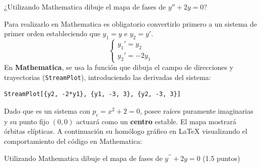 \begin{ejer}[6]
¿Utilizando Mathematica dibuje el mapa de fases de $y''+2y=0$?
\end{ejer}
\begin{sol}
Para realizarlo en Mathematica es obligatorio convertirlo primero a un sistema de primer orden estableciendo que $y_1 = y$ e $y_2 = y'$.
$$\begin{cases} y_1' = y_2 \\ y_2' = -2y_1 \end{cases}$$
En \textbf{Mathematica}, se usa la función que dibuja el campo de direcciones y trayectorias (\texttt{StreamPlot}), introduciendo las derivadas del sistema:

\begin{verbatim}
StreamPlot[{y2, -2*y1}, {y1, -3, 3}, {y2, -3, 3}]
\end{verbatim}

Dado que es un sistema con $p_c = x^2+2 = 0$, posee raíces puramente imaginarias y su punto fijo $(0,0)$ actuará como un \textbf{centro} estable. El mapa mostrará órbitas elípticas. A continuación su homólogo gráfico en \LaTeX{} visualizando el comportamiento del código en Mathematica:

\begin{center}
\end{center}
\end{sol}
\begin{ejer}[6]
Utilizando Mathematica dibuje el mapa de fases de $y^{\prime\prime}+2 y=0$ (1.5 puntos) 
\end{ejer}
